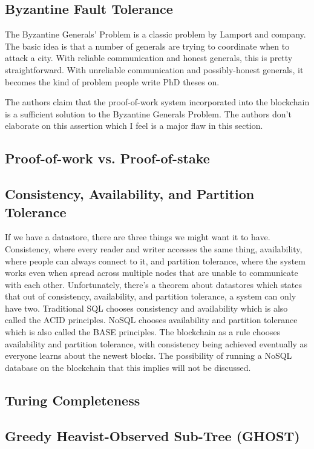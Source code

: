\documentclass{article}
\begin{document}
\subsection{Byzantine Fault Tolerance}
The Byzantine Generals' Problem is a classic problem by Lamport and company. The basic idea is that a number of generals are trying
to coordinate when to attack a city. With reliable communication and honest generals, this is pretty straightforward. With
unreliable communication and possibly-honest generals, it becomes the kind of problem people write PhD theses on.

The authors claim that the proof-of-work system incorporated into the blockchain is a sufficient solution to the Byzantine Generals Problem. The authors don't elaborate on this assertion which I feel is a major flaw in this section.

\subsection{Proof-of-work vs. Proof-of-stake}

\subsection{Consistency, Availability, and Partition Tolerance}
If we have a datastore, there are three things we might want it to have. Consistency, where every reader and writer accesses
the same thing, availability, where people can always connect to it, and partition tolerance, where the system works even when spread across multiple nodes that are unable to communicate with each other. Unfortunately, there's a theorem about datastores which states that out of consistency, availability, and partition tolerance, a system can only have two. Traditional SQL chooses consistency and availability which is also called the ACID principles. NoSQL chooses availability and partition tolerance which is also called the BASE principles. The blockchain as a rule chooses availability and partition tolerance, with consistency being achieved eventually as everyone learns about the newest blocks. The possibility of running a NoSQL database on the blockchain that this implies will not be discussed.

\subsection{Turing Completeness}

\subsection{Greedy Heavist-Observed Sub-Tree (GHOST)}
\end{document}
